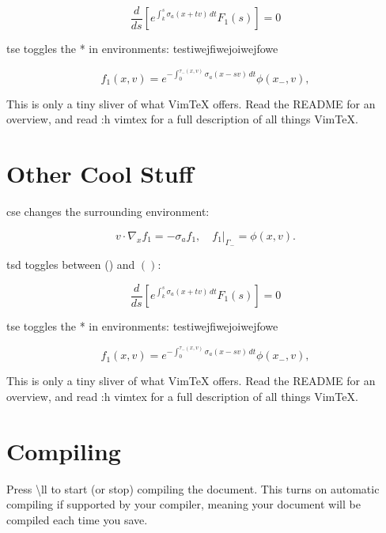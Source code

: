 \documentclass{article}
\renewcommand{\ll}{\textbackslash{}ll }
\begin{document}
\begin{equation*}
  \frac{d}{ds} \left[ e^{\int_k^s \sigma_a(x + tv)\,dt} F_1(s) \right] = 0
\end{equation*}

tse toggles the * in environments:
testiwejfiwejoiwejfowe

\begin{equation}
  f_1(x, v) = e^{-\int_0^{\tau_-(x, v)} \sigma_a(x - sv)\,dt} \phi(x_-, v),
\end{equation}

This is only a tiny sliver of what VimTeX offers.
Read the README for an overview, and read :h vimtex for a full description of
all things VimTeX.



\section{Other Cool Stuff}

cse changes the surrounding environment:

\begin{equation}
  v \cdot \nabla_x f_1 = -\sigma_a f_1, \quad f_1 \rvert_{\Gamma_-} = \phi(x,v).
\end{equation}

tsd toggles between () and \( \left( \right) \):

\begin{equation*}
  \frac{d}{ds} \left[ e^{\int_k^s \sigma_a(x + tv)\,dt} F_1(s) \right] = 0
\end{equation*}

tse toggles the * in environments:
testiwejfiwejoiwejfowe

\begin{equation}
  f_1(x, v) = e^{-\int_0^{\tau_-(x, v)} \sigma_a(x - sv)\,dt} \phi(x_-, v),
\end{equation}

This is only a tiny sliver of what VimTeX offers.
Read the README for an overview, and read :h vimtex for a full description of
all things VimTeX.




\section{Compiling}

Press \ll to start (or stop) compiling the document.
This turns on automatic compiling if supported by your compiler, meaning your
document will be compiled each time you save.
\end{document}
